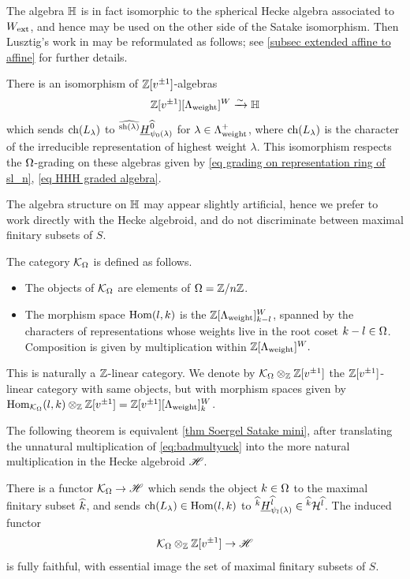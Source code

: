 The algebra $\mathbb{H}$ is in fact isomorphic to the spherical Hecke algebra associated to $W_{\operatorname{ext}}$, and hence may be used on the other side of the Satake isomorphism. Then Lusztig's work in \cite{LusztigGS} may be reformulated as follows; see \cref{subsec extended affine to affine} for further details.

\begin{theorem}\label{thm Soergel Satake mini}
    There is an isomorphism of $\mathbb{Z}[v^{\pm 1}]$-algebras
    $$\mathbb{Z}[v^{\pm 1}][\Lambda_{\operatorname{weight}}]^W \xrightarrow{\sim} \mathbb{H}$$
    which sends $\operatorname{ch}(L_\lambda)$ to ${}^{\widehat{\operatorname{sh}(\lambda)}}\underline{H}^{\widehat{0}}_{\psi_0(\lambda)}$ for $\lambda \in \Lambda_{\operatorname{weight}}^+$, where $\operatorname{ch}(L_\lambda)$ is the character of the irreducible representation of highest weight $\lambda$.
    This isomorphism respects the $\Omega$-grading on these algebras given by \cref{eq grading on representation ring of sl_n}, \cref{eq HHH graded algebra}.
\end{theorem}

The algebra structure on $\mathbb{H}$ may appear slightly artificial, hence we prefer to work directly with the Hecke algebroid, and do not discriminate between maximal finitary subsets of $S$.

\begin{defn}\label{defn KRepom}
    The category $\mathcal{K}_{\Omega}$ is defined as follows.
    \begin{itemize}
        \item  The objects of $\mathcal{K}_{\Omega}$ are elements of $\Omega=\mathbb{Z}/n\mathbb{Z}$.
        \item The morphism space $\operatorname{Hom}(l,k)$ is the $\mathbb{Z}[\Lambda_{\operatorname{weight}}]^W_{k-l}$, spanned by the characters of representations whose weights live in the root coset $k-l \in \Omega$. Composition is given by multiplication within $\mathbb{Z}[\Lambda_{\operatorname{weight}}]^W.$
    \end{itemize}
    This is naturally a $\mathbb{Z}$-linear category. 
    We denote by $\mathcal{K}_{\Omega} \otimes_{\mathbb{Z}}\mathbb{Z}[v^{\pm 1}]$ the $\mathbb{Z}[v^{\pm 1}]$-linear category with same objects, but with morphism spaces given by $\operatorname{Hom}_{\mathcal{K}_{\Omega}}(l,k)\otimes_{\mathbb{Z}}\mathbb{Z}[v^{\pm 1}]=\mathbb{Z}[v^{\pm 1}][\Lambda_{\operatorname{weight}}]^W_k$.
\end{defn}

The following theorem is equivalent \cref{thm Soergel Satake mini}, after translating the unnatural multiplication of \eqref{eq:badmultyuck} into the more natural multiplication in the Hecke algebroid $\mathscr{H}$.

\begin{theorem}\label{thm Soergel Satake}
    There is a functor $\mathcal{K}_{\Omega} \rightarrow \mathscr{H}$ which
    sends the object $k \in \Omega$ to the maximal finitary subset $\widehat{k}$,
    and sends $\operatorname{ch}(L_{\lambda})\in \operatorname{Hom}(l,k)$ to ${}^{\widehat{k}}\underline{H}^{\widehat{l}}_{\psi_l(\lambda)} \in {}^{\widehat{k}}\mathcal{H}^{\widehat{l}}$.
    The induced functor 
    $$\mathcal{K}_{\Omega} \otimes_{\mathbb{Z}}\mathbb{Z}[v^{\pm 1}] \rightarrow \mathscr{H}$$ is fully faithful, with essential image the set of maximal finitary subsets of $S$.
\end{theorem}

